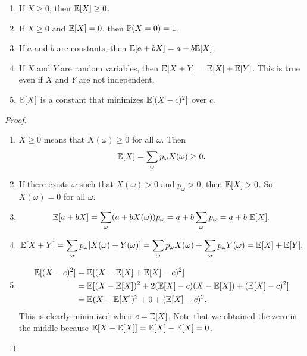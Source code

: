%
\begin{note}
  \begin{field}
    \begin{thm}\leavevmode
    \begin{enumerate}
      \item If $X \geq 0$, then $\E[X] \geq 0$.
      \item If $X\geq 0$ and $\E[X] = 0$, then $\P(X = 0) = 1$.
      \item If $a$ and $b$ are constants, then $\E[a + bX] = a + b\E[X]$.
      \item If $X$ and $Y$ are random variables, then $\E[X + Y] = \E[X] + \E[Y]$. This is true even if $X$ and $Y$ are not independent.
      \item $\E[X]$ is a constant that minimizes $\E[(X - c)^2]$ over $c$.
    \end{enumerate}
    \end{thm}
  \end{field}
  \begin{field}
    \begin{proof}\leavevmode
      \begin{enumerate}
        \item $X \geq 0$ means that $X(\omega) \geq 0$ for all $\omega$. Then
          \[
            \E[X] = \sum_\omega p_\omega X(\omega) \geq 0.
          \]
        \item If there exists $\omega$ such that $X(\omega) > 0$ and $p_\omega > 0$, then $\E[X] > 0$. So $X(\omega) = 0$ for all $\omega$.
        \item
          \[
            \E[a + bX] = \sum_\omega (a + bX(\omega))p_\omega = a + b\sum_\omega p_\omega= a + b\ \E[X].
          \]
        \item
          \[ \E[X + Y] = \sum_\omega p_\omega[X(\omega) + Y(\omega)] = \sum_\omega p_\omega X(\omega) + \sum_\omega p_\omega Y(\omega) = \E[X] + \E[Y].
          \]
        \item
          \begin{align*}
            \E[(X - c)^2] &= \E[(X - \E[X] + \E[X] - c)^2]\\
            &= \E[(X - \E[X])^2 + 2(\E[X] - c)(X - \E[X]) + (\E[X] - c)^2]\\
            &= \E(X - \E[X])^2 + 0 + (\E[X] - c)^2.
          \end{align*}
          This is clearly minimized when $c = \E[X]$. Note that we obtained the zero in the middle because $\E[X - \E[X]] = \E[X] - \E[X] = 0$.\qedhere
      \end{enumerate}
    \end{proof}
  \end{field}
  \xplain{}%
\end{note}

